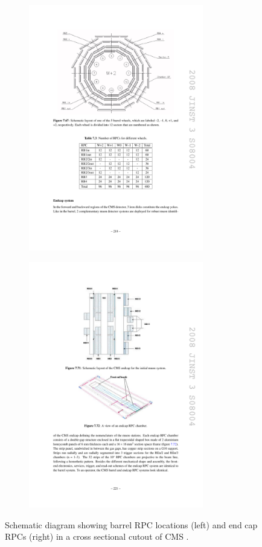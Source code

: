 \begin{figure}[tbh]
\centering
\begin{subfigure}{0.45\textwidth}
\centering
\includegraphics[width=3in]{figures/rpcbarrel.pdf}
\caption{}
\end{subfigure}
\begin{subfigure}{0.45\textwidth}
\centering
\includegraphics[width=3in]{figures/rpcendcap.pdf}
\caption{}
\end{subfigure}
\caption{Schematic diagram showing barrel RPC locations (left) and end cap RPCs (right) in a cross sectional cutout of CMS \cite{1748-0221-3-08-S08004}.}
\label{fig:rpcs}
\end{figure}

